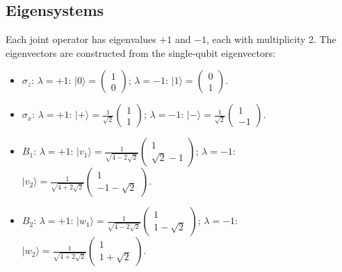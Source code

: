 \documentclass{article}
\begin{document}
\subsection*{Eigensystems}
Each joint operator has eigenvalues \( +1 \) and \( -1 \), each with multiplicity 2. The eigenvectors are constructed from the single-qubit eigenvectors:
\begin{itemize}
    \item \( \sigma_z \): \( \lambda = +1 \): \( |0\rangle = \begin{pmatrix} 1 \\ 0 \end{pmatrix} \); \( \lambda = -1 \): \( |1\rangle = \begin{pmatrix} 0 \\ 1 \end{pmatrix} \).
    \item \( \sigma_x \): \( \lambda = +1 \): \( |+\rangle = \frac{1}{\sqrt{2}} \begin{pmatrix} 1 \\ 1 \end{pmatrix} \); \( \lambda = -1 \): \( |-\rangle = \frac{1}{\sqrt{2}} \begin{pmatrix} 1 \\ -1 \end{pmatrix} \).
    \item \( B_1 \): \( \lambda = +1 \): \( |v_1\rangle = \frac{1}{\sqrt{4-2\sqrt{2}}} \begin{pmatrix} 1 \\ \sqrt{2}-1 \end{pmatrix} \); \( \lambda = -1 \): \( |v_2\rangle = \frac{1}{\sqrt{4+2\sqrt{2}}} \begin{pmatrix} 1 \\ -1-\sqrt{2} \end{pmatrix} \).
    \item \( B_2 \): \( \lambda = +1 \): \( |w_1\rangle = \frac{1}{\sqrt{4-2\sqrt{2}}} \begin{pmatrix} 1 \\ 1-\sqrt{2} \end{pmatrix} \); \( \lambda = -1 \): \( |w_2\rangle = \frac{1}{\sqrt{4+2\sqrt{2}}} \begin{pmatrix} 1 \\ 1+\sqrt{2} \end{pmatrix} \).
\end{itemize}
\end{document}
